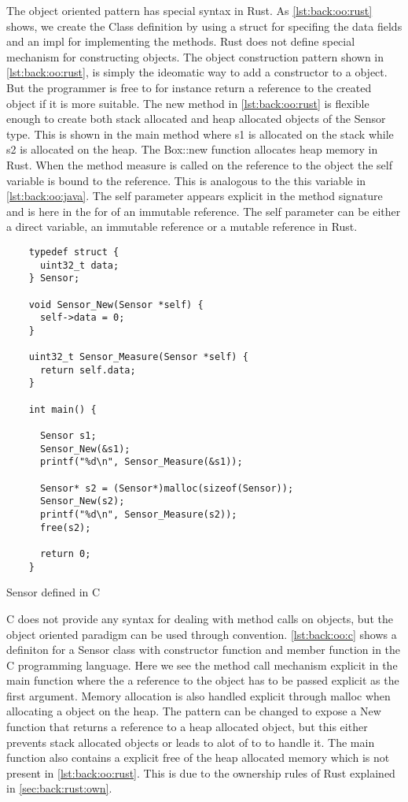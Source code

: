 The object oriented pattern has special syntax in Rust.
As \autoref{lst:back:oo:rust} shows, we create the Class definition by using a struct for specifing the data fields and an impl for implementing the methods.
Rust does not define special mechanism for constructing objects.
The object construction pattern shown in \autoref{lst:back:oo:rust}, is simply the ideomatic way to add a constructor to a object.
But the programmer is free to for instance return a reference to the created object if it is more suitable.
The new method in \autoref{lst:back:oo:rust} is flexible enough to create both stack allocated and heap allocated objects of the Sensor type.
This is shown in the main method where s1 is allocated on the stack while s2 is allocated on the heap.
The Box::new function allocates heap memory in Rust.
When the method measure is called on the reference to the object the self variable is bound to the reference.
This is analogous to the this variable in \autoref{lst:back:oo:java}.
The self parameter appears explicit in the method signature and is here in the for of an immutable reference.
The self parameter can be either a direct variable, an immutable reference or a mutable reference in Rust.

\begin{listing}[H]
  \begin{verbatim}
    typedef struct {
      uint32_t data;
    } Sensor;

    void Sensor_New(Sensor *self) {
      self->data = 0;
    }

    uint32_t Sensor_Measure(Sensor *self) {
      return self.data;
    }

    int main() {

      Sensor s1;
      Sensor_New(&s1);
      printf("%d\n", Sensor_Measure(&s1));

      Sensor* s2 = (Sensor*)malloc(sizeof(Sensor));
      Sensor_New(s2);
      printf("%d\n", Sensor_Measure(s2));
      free(s2);

      return 0;
    }
  \end{verbatim}
  \caption{Sensor defined in C}
  \label{lst:back:oo:c}
\end{listing}

C does not provide any syntax for dealing with method calls on objects, but the object oriented paradigm can be used through convention.
\autoref{lst:back:oo:c} shows a definiton for a Sensor class with constructor function and member function in the C programming language.
Here we see the method call mechanism explicit in the main function where the a reference to the object has to be passed explicit as the first argument.
Memory allocation is also handled explicit through malloc when allocating a object on the heap.
The pattern can be changed to expose a New function that returns a reference to a heap allocated object, but this either prevents stack allocated objects or leads to alot of to to handle it.
The main function also contains a explicit free of the heap allocated memory which is not present in \autoref{lst:back:oo:rust}.
This is due to the ownership rules of Rust explained in \autoref{sec:back:rust:own}.

